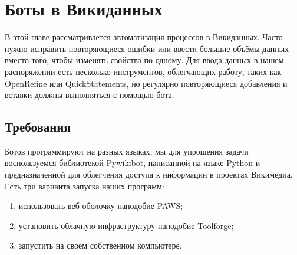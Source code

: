 \chapter{Боты в Викиданных}
\label{ch:bots}

\makeatletter
\long{}%
\makeatother



В этой главе рассматривается автоматизация процессов в Викиданных. 
Часто нужно исправить повторяющиеся ошибки или ввести большие объёмы данных 
вместо того, чтобы изменять свойства по одному. 
Для ввода данных в нашем распоряжении есть несколько инструментов, облегчающих работу, 
таких как OpenRefine %
 или QuickStatements, но регулярно повторяющиеся добавления и вставки должны выполняться с помощью бота.


\section{Требования}

\label{sec:requirements}
Ботов программируют на разных языках, мы для упрощения задачи воспользуемся библиотекой Pywikibot, 
написанной на языке Python и предназначенной для облегчения доступа 
к информации в проектах Викимедиа. Есть три варианта запуска наших программ:
\begin{enumerate}[1)]
  \item использовать веб-оболочку наподобие PAWS; 
  \item установить облачную инфраструктуру наподобие Toolforge;
  \item запустить на своём собственном компьютере.
\end{enumerate}

